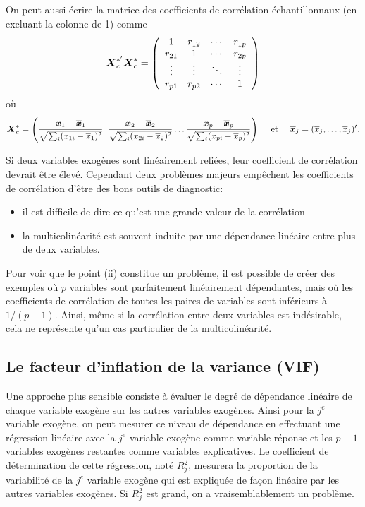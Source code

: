 On peut aussi écrire la matrice des coefficients de corrélation échantillonnaux (en excluant la colonne de 1) comme
\begin{eqnarray*}
\mbox{\boldmath$X$\unboldmath}_c^{*'}\mbox{\boldmath$X$\unboldmath}_c^{*}=\left(\begin{array}{cccc}
1 & r_{12} &  \cdots & r_{1p} \\
r_{21} & 1 & \cdots & r_{2p} \\
\vdots & \vdots & \ddots  & \vdots \\
r_{p1} & r_{p2} & \cdots  & 1
\end{array}
\right)
\end{eqnarray*}
où $$\mbox{\boldmath$X$\unboldmath}_c^*=\left(\frac{\mbox{\boldmath$x$\unboldmath}_1-\overline{\mbox{\boldmath$x$\unboldmath}}_1}{\sqrt{\sum_i (x_{1i}-\overline x_1)^2} }\;\;\frac{\mbox{\boldmath$x$\unboldmath}_2-\overline{\mbox{\boldmath$x$\unboldmath}}_2}{\sqrt{\sum_i (x_{2i}-\overline x_2)^2}} \ldots \frac{\mbox{\boldmath$x$\unboldmath}_p-\overline{\mbox{\boldmath$x$\unboldmath}}_p}{\sqrt{\sum_i (x_{pi}-\overline x_p)^2}}  \right)\quad \text{ et } \quad \overline{\mbox{\boldmath$x$\unboldmath}}_j=(\overline x_j,\ldots,\overline x_j)'.$$



Si deux variables exogènes sont linéairement reliées, leur coefficient de corrélation devrait
être élevé. Cependant deux problèmes majeurs empêchent les coefficients de corrélation
d'être des bons outils de diagnostic:
\begin{itemize}
\item[(i)] il est difficile de dire ce qu'est une grande valeur de la corrélation
\item[(ii)] la multicolinéarité est souvent induite par une dépendance linéaire entre plus de deux variables.
\end{itemize}
Pour voir que le point (ii) constitue un
problème, il est possible de créer des exemples où $p$ variables sont parfaitement linéairement
dépendantes, mais où les coefficients de corrélation de toutes les paires de variables sont
inférieurs à $1/(p-1)$. Ainsi, même si la corrélation entre deux variables est indésirable, cela
ne représente qu'un cas particulier de la multicolinéarité.

\subsection{Le facteur d'inflation de la variance (VIF)}
\label{sec:vif}
Une approche plus sensible consiste à évaluer le degré de dépendance linéaire de chaque
variable exogène sur les autres variables exogènes. Ainsi pour la $j^e$ variable exogène,
on peut mesurer ce niveau de dépendance en effectuant une régression linéaire avec la $j^e$
variable exogène comme variable réponse et les $p-1$ variables exogènes restantes comme variables explicatives. Le coefficient de détermination de cette régression, noté $R^2_j$, mesurera la proportion de la variabilité de la $j^e$ variable exogène qui est expliquée de fa\c{c}on linéaire par les autres variables exogènes. Si $R_j^2$ est grand, on a vraisemblablement un problème.

